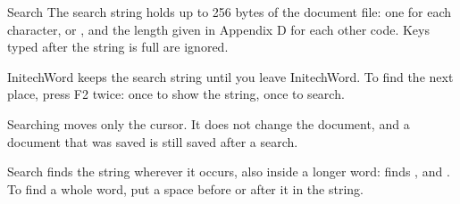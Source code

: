\begin{Feature}{Search}
The search string holds up to 256 bytes of the document file: one for each
character, \Code{[HRt]} or \Code{[HPg]}, and the length given in Appendix D
for each other code.  Keys typed after the string is full are ignored.

InitechWord keeps the search string until you leave InitechWord.  To find the next
place, press F2 twice: once to show the string, once to search.

Searching moves only the cursor.  It does not change the document, and a
document that was saved is still saved after a search.

Search finds the string wherever it occurs, also inside a longer word:
 finds ,  and .  To find a
whole word, put a space before or after it in the string.

\end{Feature}

